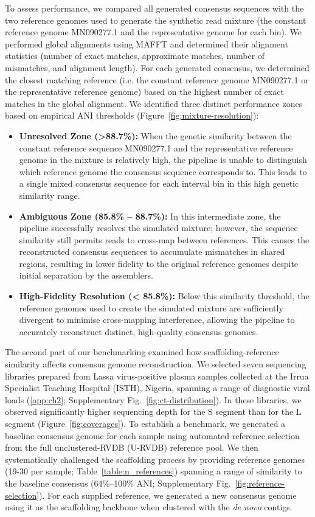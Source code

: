 To assess performance, we compared all generated consensus sequences with the two reference genomes used to generate the synthetic read mixture (the constant reference genome MN090277.1 and the representative genome for each bin). We performed global alignments using MAFFT \citep{Katoh2002-ox} and determined their alignment statistics (number of exact matches, approximate matches, number of mismatches, and alignment length). For each generated consensus, we determined the closest matching reference (i.e. the constant reference genome MN090277.1 or the representative reference genome) based on the highest number of exact matches in the global alignment. We identified three distinct performance zones based on empirical ANI thresholds (Figure~\ref{fig:mixture-resolution}):
\begin{itemize}
    \item \textbf{Unresolved Zone (>88.7\%):} When the genetic similarity between the constant reference sequence MN090277.1 and the representative reference genome in the mixture is relatively high, the pipeline is unable to distinguish which reference genome the consensus sequence corresponds to. This leads to a single mixed consensus sequence for each interval bin in this high genetic similarity range.
    \item \textbf{Ambiguous Zone (85.8\% – 88.7\%):} In this intermediate zone, the pipeline successfully resolves the simulated mixture; however, the sequence similarity still permits reads to cross-map between references. This causes the reconstructed consensus sequences to accumulate mismatches in shared regions, resulting in lower fidelity to the original reference genomes despite initial separation by the assemblers.
    \item \textbf{High-Fidelity Resolution (< 85.8\%):}  Below this similarity threshold, the reference genomes used to create the simulated mixture are sufficiently divergent to minimise cross-mapping interference, allowing the pipeline to accurately reconstruct distinct, high-quality consensus genomes.
\end{itemize}

The second part of our benchmarking examined how scaffolding-reference similarity affects consensus genome reconstruction. We selected seven sequencing libraries prepared from Lassa virus-positive plasma samples collected at the Irrua Specialist Teaching Hospital (ISTH), Nigeria, spanning a range of diagnostic viral loads (\autoref{app:ch2}; Supplementary Fig.~\ref{fig:ct-distribution}). In these libraries, we observed significantly higher sequencing depth for the S segment than for the L segment (Figure~\ref{fig:coverages}). To establish a benchmark, we generated a baseline consensus genome for each sample using automated reference selection from the full unclustered-RVDB (U-RVDB) reference pool. We then systematically challenged the scaffolding process by providing reference genomes (19-30 per sample; Table~\ref{table:n_references}) spanning a range of similarity to the baseline consensus (64\%--100\% ANI; Supplementary Fig.~\ref{fig:reference-selection}). For each supplied reference, we generated a new consensus genome using it as the scaffolding backbone when clustered with the \textit{de novo} contigs.

